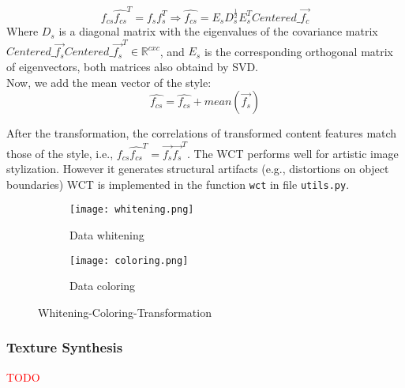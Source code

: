 \begin{equation}
\hat{f_{cs}}\hat{f_{cs}}^T=f_sf_s^T \Rightarrow  \hat{f_{cs}} = E_sD_s^{\frac{1}{2}}E_s^TCentered\_\vec{f_c} 
\end{equation}
Where $D_s$ is a diagonal matrix with the eigenvalues of the covariance matrix $Centered\_\vec{f_s}Centered\_\vec{f_s}^T \in\mathbb{R}^{cxc}$, and $E_s$ is the corresponding orthogonal matrix of eigenvectors, both matrices also obtaind by SVD.\\
Now, we add the mean vector of the style:
\begin{equation}
\hat{f_{cs}} = \hat{f_{cs}}+mean(\vec{f_s})
\end{equation}

After the transformation, the correlations of transformed content features match those of the style, i.e., $\hat{f_{cs}} \hat{f_{cs}}^T = \vec{f_s} \vec{f_s}^T$.
The WCT performs well for artistic image stylization. However it generates
structural artifacts (e.g., distortions on object boundaries)
WCT is implemented in the function \texttt{wct} in file \texttt{utils.py}.

\begin{figure}[h!]
	\centering
	\begin{subfigure}[b]{0.4\linewidth}
		\texttt{[image: whitening.png]}
		\caption{Data whitening}
	\end{subfigure}
	\begin{subfigure}[b]{0.4\linewidth}
		\texttt{[image: coloring.png]}
		\caption{Data coloring}
	\end{subfigure}
	\caption{Whitening-Coloring-Transformation}
	\label{fig:WCT-vis}
\end{figure}

\subsubsection{Texture Synthesis}
\textcolor{red}{TODO}